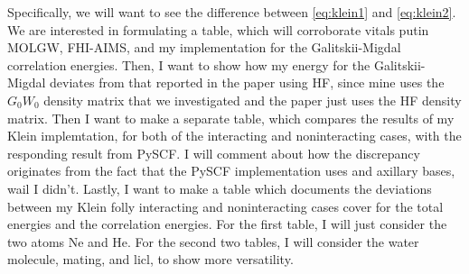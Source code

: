 \documentclass[12pt]{article}
\begin{document}
Specifically, we will want to see the difference between \ref{eq:klein1} and \ref{eq:klein2}. 
We are interested in formulating a table, which will corroborate vitals putin MOLGW, FHI-AIMS, and my implementation for the Galitskii-Migdal correlation energies. Then, I want to show how my energy for the Galitskii-Migdal deviates from that reported in the paper using HF, since mine uses the $G_0W_0$ density matrix that we investigated and the paper just uses the HF density matrix.
Then I want to make a separate table, which compares the results of my Klein implemtation, for both of the interacting and noninteracting cases, with the responding result from PySCF. I will comment about how the discrepancy originates from the fact that the PySCF implementation uses and axillary bases, wail I didn't. Lastly, I want to make a table which documents the deviations between my Klein folly interacting and noninteracting cases cover for the total energies and the correlation energies. For the first table, I will just consider the two atoms Ne and He. For the second two tables, I will consider the water molecule, mating, and licl, to show more versatility.
\end{document}
